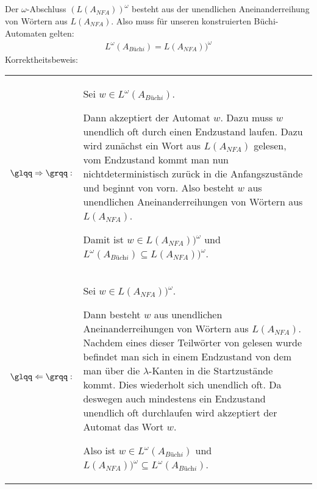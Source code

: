 \documentclass[12pt,a4paper]{../krautsourcing/homework}
\begin{document}
\subsection{}
Der \(\omega\)-Abschluss \((L(A_\textit{NFA}))^\omega\) besteht aus der unendlichen Aneinanderreihung von Wörtern aus \(L(A_\textit{NFA})\). Also muss für unseren konstruierten Büchi-Automaten gelten:
\begin{align*}
L^\omega (A_\textit{Büchi}) = L(A_\textit{NFA}))^\omega
\end{align*}
\noindent Korrektheitsbeweis:\\
\begin{tabularx}{\linewidth}{@{}>{\bfseries}l@{\hspace{.5em}}X@{}}
    \(\glqq\Rightarrow\grqq:\) &
    Sei \(w \in L^\omega (A_\textit{Büchi}) \).

    Dann akzeptiert der Automat \(w\). Dazu muss \(w\) unendlich oft durch einen Endzustand laufen. Dazu wird zunächst ein Wort aus \(L(A_\textit{NFA})\) gelesen, vom Endzustand kommt man nun nichtdeterministisch zurück in die Anfangszustände und beginnt von vorn. Also besteht \(w\) aus unendlichen Aneinanderreihungen von Wörtern aus \(L(A_\textit{NFA})\).
	
    Damit ist \(w \in L(A_\textit{NFA}))^\omega \) und \( L^\omega (A_\textit{Büchi})  \subseteq L(A_\textit{NFA}))^\omega \).

     \\

    \(\glqq\Leftarrow\grqq:\) &
    Sei \(w \in L(A_\textit{NFA}))^\omega \).

    Dann besteht \(w\) aus unendlichen Aneinanderreihungen von Wörtern aus \(L(A_\textit{NFA})\). Nachdem eines dieser Teilwörter von gelesen wurde befindet man sich in einem Endzustand von dem man über die \(\lambda\)-Kanten in die Startzustände kommt. Dies wiederholt sich unendlich oft. Da deswegen auch mindestens ein Endzustand unendlich oft durchlaufen wird akzeptiert der Automat das Wort \(w\).
	
    Also ist \(w \in L^\omega (A_\textit{Büchi})\) und \(L(A_\textit{NFA}))^\omega \subseteq L^\omega (A_\textit{Büchi})\).	  
\end{tabularx}

\subsection{}
\end{document}
